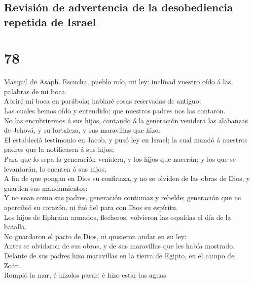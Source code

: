 \hypertarget{revisiuxf3n-de-advertencia-de-la-desobediencia-repetida-de-israel}{%
\subsection{Revisión de advertencia de la desobediencia repetida de
Israel}\label{revisiuxf3n-de-advertencia-de-la-desobediencia-repetida-de-israel}}

\hypertarget{section-19-78}{%
\section{78}\label{section-19-78}}

 Masquil de Asaph. Escucha, pueblo mío, mi ley: inclinad
vuestro oído á las palabras de mi boca.\\
 Abriré mi boca en parábola; hablaré cosas reservadas de
antiguo:\\
 Las cuales hemos oído y entendido; que nuestros padres
nos las contaron.\\
 No las encubriremos á sus hijos, contando á la generación
venidera las alabanzas de Jehová, y su fortaleza, y sus maravillas que
hizo.\\
 El estableció testimonio en Jacob, y pusó ley en Israel;
la cual mandó á nuestros padres que la notificasen á sus hijos;\\
 Para que lo sepa la generación venidera, y los hijos que
nacerán; y los que se levantarán, lo cuenten á sus hijos;\\
 A fin de que pongan en Dios su confianza, y no se olviden
de las obras de Dios, y guarden sus mandamientos:\\
 Y no sean como sus padres, generación contumaz y rebelde;
generación que no apercibió su corazón, ni fué fiel para con Dios su
espíritu.\\
 Los hijos de Ephraim armados, flecheros, volvieron las
espaldas el día de la batalla.\\
 No guardaron el pacto de Dios, ni quisieron andar en su
ley:\\
 Antes se olvidaron de sus obras, y de sus maravillas que
les había mostrado.\\
 Delante de sus padres hizo maravillas en la tierra de
Egipto, en el campo de Zoán.\\
 Rompió la mar, é hízolos pasar; é hizo estar las aguas
